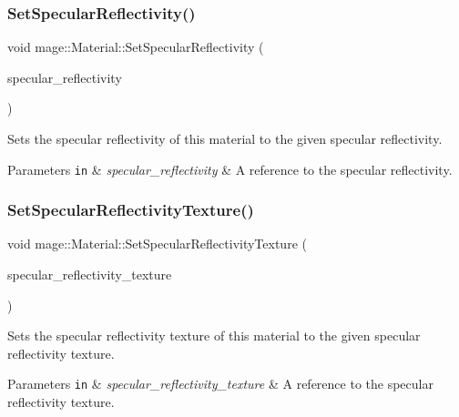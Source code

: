 \subsubsection{\texorpdfstring{Set\+Specular\+Reflectivity()}{SetSpecularReflectivity()}\hspace{0.1cm}{\footnotesize\ttfamily [2/2]}}
{\footnotesize\ttfamily void mage\+::\+Material\+::\+Set\+Specular\+Reflectivity (\begin{DoxyParamCaption}\item[{\hyperlink{structmage_1_1_r_g_b_spectrum}{R\+G\+B\+Spectrum} \&\&}]{specular\+\_\+reflectivity }\end{DoxyParamCaption})\hspace{0.3cm}{\ttfamily [noexcept]}}

Sets the specular reflectivity of this material to the given specular reflectivity.


\begin{DoxyParams}[1]{Parameters}
\mbox{\tt in}  & {\em specular\+\_\+reflectivity} & A reference to the specular reflectivity. \\
\hline
\end{DoxyParams}
\hypertarget{structmage_1_1_material_a130430244dfd0b5866b00fca523e874c}{}\label{structmage_1_1_material_a130430244dfd0b5866b00fca523e874c} 
\subsubsection{\texorpdfstring{Set\+Specular\+Reflectivity\+Texture()}{SetSpecularReflectivityTexture()}}
{\footnotesize\ttfamily void mage\+::\+Material\+::\+Set\+Specular\+Reflectivity\+Texture (\begin{DoxyParamCaption}\item[{\hyperlink{namespacemage_a1e01ae66713838a7a67d30e44c67703e}{Shared\+Ptr}$<$ \hyperlink{classmage_1_1_texture}{Texture} $>$}]{specular\+\_\+reflectivity\+\_\+texture }\end{DoxyParamCaption})}

Sets the specular reflectivity texture of this material to the given specular reflectivity texture.


\begin{DoxyParams}[1]{Parameters}
\mbox{\tt in}  & {\em specular\+\_\+reflectivity\+\_\+texture} & A reference to the specular reflectivity texture. \\
\hline
\end{DoxyParams}
\hypertarget{structmage_1_1_material_afe8121e13eb9fff9ffb281e7c807f2e0}{}\label{structmage_1_1_material_afe8121e13eb9fff9ffb281e7c807f2e0} 

